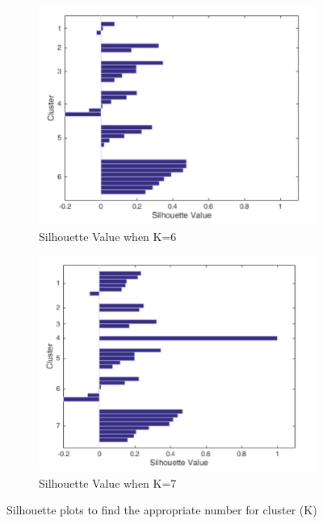 \begin{figure}[!hbt]
\begin{subfigure}{0.45\textwidth}
 \includegraphics[width=\textwidth]{persona3e}
 \caption{Silhouette Value when K=6}
    \end{subfigure}\hspace{0.01\textwidth}
    \begin{subfigure}{0.45\textwidth}
\includegraphics[width=\textwidth]{persona3f}
  \caption{Silhouette Value when K=7}
    \end{subfigure}
    \caption{Silhouette plots to find the appropriate number for cluster (K)}
\end{figure}

